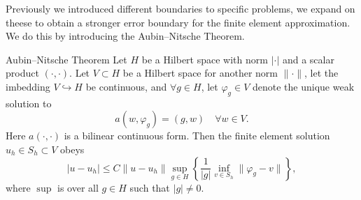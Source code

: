 Previously we introduced different boundaries to specific problems, we expand on theese to obtain a stronger error boundary for the finite element approximation. We do this by introducing the Aubin–Nitsche Theorem.

\begin{thmx}{Aubin–Nitsche Theorem\label{thm:aubin-nitsche}}
    Let $H$ be a Hilbert space with norm $|\cdot|$ and a scalar product $(\cdot,\cdot)$.
    Let $V\subset H$ be a Hilbert space for another norm $\|\cdot\|$, let the imbedding
    $V \hookrightarrow H$ be continuous,
    and $\forall g \in H$, let $\varphi_g \in V$ denote the unique weak solution to 
    \begin{equation}
        a(w,\varphi_g) = (g,w) \quad \forall w\in V. \label{eq:aubin_nitsche_antagelse}
    \end{equation}
    Here $a(\cdot,\cdot)$ is a bilinear continuous form.
    Then the finite element solution $u_h\in S_h \subset V$ obeys
    \begin{equation*}
        |u-u_h| \leq C \|u-u_h\| \sup_{g\in H} \left \{ \frac{1}{|g|} \inf_{v \in S_h} \|\varphi_g - v\| \right \},
    \end{equation*}
    where $\sup$ is over all $g\in H$ such that $|g|\neq 0$.
\end{thmx}
